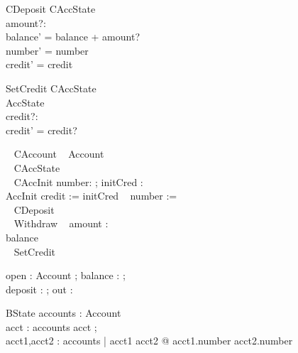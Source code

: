 \documentclass[a4paper,10pt]{article}
\begin{document}
 \begin{schema}{CDeposit}
 \Delta CAccState\\
 amount?:\nat\\
 \where
 balance' = balance + amount?\\
 number' = number\\
 credit' = credit 
 \end{schema}

 \begin{schema}{SetCredit}
 \Delta CAccState\\
 \Xi AccState\\
 credit?:\nat\\
 \where
 credit' = credit? 
 \end{schema}



\begin{circus}
  \ohcircclass ~ CAccount ~ \circdef \ohcircextends Account ~ \circbegin\\

  \ohcircstate ~ CAccState \\

  \ohcircinitial ~ CAccInit \circdef \circval number: \nat ; initCred : \nat \\
  \circspot AccInit \circseq credit := initCred ~ \circseq number := \ohcircnull\\

  \ohcircpublic ~ CDeposit\\
  
  \ohcircpublic ~ Withdraw ~ \circdef \circval amount : \nat \\
  \circspot  balance \prefixcolon [ amount \leq balance + credit , balance' = balance - amount ] \\
  
  \ohcircpublic ~ SetCredit\\

\circend
\end{circus}



\begin{circus}
\circchannel open : Account ; balance : \nat ;\\
             deposit : \nat \cross \nat ; out : \nat
\end{circus}


\begin{schema}{BState}
 accounts : \power Account\\
\where
\forall acct : accounts \spot acct \neq \ohcircnull ;\\
\forall acct1,acct2 : accounts | acct1 \neq acct2 @ acct1.number \neq acct2.number
\end{schema}
\end{document}
